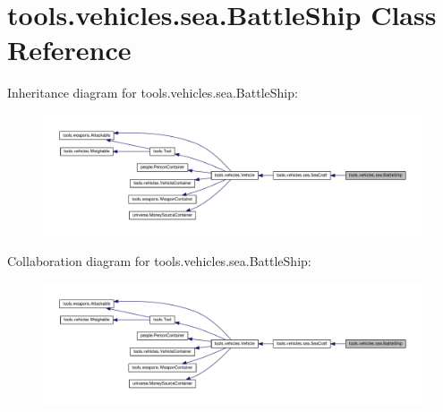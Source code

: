 \hypertarget{classtools_1_1vehicles_1_1sea_1_1_battle_ship}{}\section{tools.\+vehicles.\+sea.\+Battle\+Ship Class Reference}
\label{classtools_1_1vehicles_1_1sea_1_1_battle_ship}


Inheritance diagram for tools.\+vehicles.\+sea.\+Battle\+Ship\+:
\nopagebreak
\begin{figure}[H]
\begin{center}
\leavevmode
\includegraphics[width=350pt]{classtools_1_1vehicles_1_1sea_1_1_battle_ship__inherit__graph}
\end{center}
\end{figure}


Collaboration diagram for tools.\+vehicles.\+sea.\+Battle\+Ship\+:
\nopagebreak
\begin{figure}[H]
\begin{center}
\leavevmode
\includegraphics[width=350pt]{classtools_1_1vehicles_1_1sea_1_1_battle_ship__coll__graph}
\end{center}
\end{figure}
